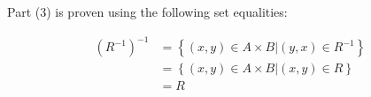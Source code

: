 \documentclass[11pt]{article}
\begin{document}
\begin{myproof}
Part (3) is proven using the following set equalities:

\[
\begin{aligned}
\left( {R^{ - 1} } \right)^{ - 1}  &= \left\{ {\left. {\left( {x, y} \right) \in A \times B} \right| \left( {y, x} \right) \in R^{ - 1} } \right\} \\ 
                                   &= \left\{ {\left. {\left( {x, y} \right) \in A \times B} \right| \left( {x, y} \right) \in R} \right\} \\ 
                                   &= R  \\
\end{aligned} 
\]
\end{myproof}
\end{document}
